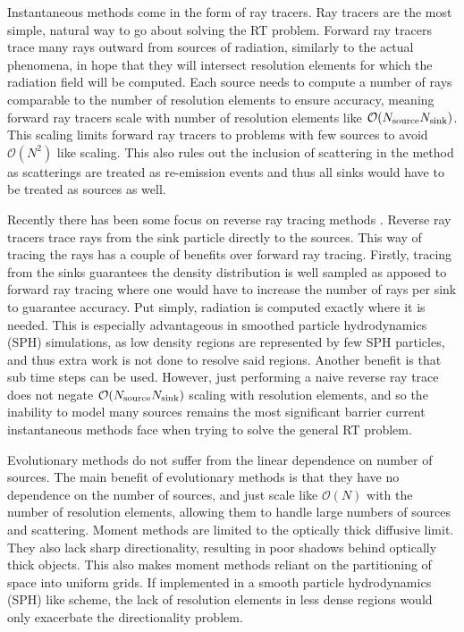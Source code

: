 \documentclass[fleqn,usenatbib]{mnras}
\begin{document}
Instantaneous methods come in the form of ray tracers. Ray tracers are the most
 simple, natural way to go about solving the RT problem. Forward ray tracers 
trace many rays outward from sources of radiation, similarly to the actual 
phenomena, in hope that they will intersect resolution elements for which the 
radiation field will be computed. Each source needs to compute a number of rays
 comparable to the number of resolution elements to ensure accuracy, 
meaning forward ray tracers scale with number of resolution elements like 
$\mathcal{O}(N_{\rm source} N_{\rm sink})$. This scaling limits forward ray 
tracers to problems with few sources to avoid $\mathcal{O}(N^2)$ like scaling. 
This also rules out the inclusion of scattering in the method as scatterings 
are treated as re-emission events and thus all sinks would have to be treated 
as sources as well. 

Recently there has been some focus on reverse ray tracing methods 
\citep{clarkEt12, altayTheuns13}. Reverse ray tracers trace rays from the sink 
particle directly to the sources. This way of tracing the rays has a couple of 
benefits over forward ray tracing. Firstly, tracing from the sinks guarantees 
the density distribution is well sampled as apposed to forward ray tracing 
where one would have to increase the number of rays per sink to guarantee 
accuracy. Put simply, radiation is computed exactly where it is needed. This 
is especially advantageous in smoothed particle hydrodynamics (SPH) 
simulations, as low density regions are represented by few SPH particles, and 
thus extra work is not done to resolve said regions. Another benefit is that 
sub time steps can be used. However, just performing a naive reverse ray trace 
does not negate $\mathcal{O}(N_{\rm source} N_{\rm sink})$ scaling with 
resolution elements, and so the inability to model many sources remains the 
most significant barrier current instantaneous methods face when trying to 
solve the general RT problem.

Evolutionary methods do not suffer from the linear dependence on number of 
sources. The main benefit of evolutionary methods is that they have no 
dependence on the number of sources, and just scale like $\mathcal{O}(N)$ with
the number of resolution elements, allowing them to handle large numbers of 
sources and scattering. Moment methods are limited to the optically thick 
diffusive limit. They also lack sharp directionality, resulting in poor shadows
behind optically thick objects. This also makes moment methods reliant on the 
partitioning of space into uniform grids. If implemented in a smooth particle 
hydrodynamics (SPH) like scheme, the lack of resolution elements in less dense 
regions would only exacerbate the directionality problem. 
\end{document}

